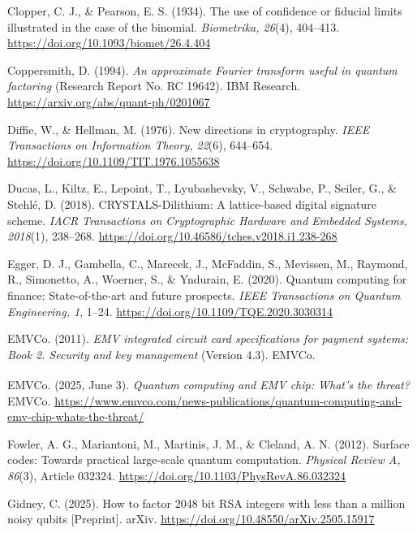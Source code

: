 \documentclass[12pt,oneside]{report}
\begin{document}
Clopper, C. J., \& Pearson, E. S. (1934). The use of confidence or fiducial limits illustrated in the case of the binomial. \textit{Biometrika, 26}(4), 404–413. \url{https://doi.org/10.1093/biomet/26.4.404}
\par

Coppersmith, D. (1994). \textit{An approximate Fourier transform useful in quantum factoring} (Research Report No. RC 19642). IBM Research. \url{https://arxiv.org/abs/quant-ph/0201067}
\par

Diffie, W., \& Hellman, M. (1976). New directions in cryptography. \textit{IEEE Transactions on Information Theory, 22}(6), 644–654. \url{https://doi.org/10.1109/TIT.1976.1055638}
\par

Ducas, L., Kiltz, E., Lepoint, T., Lyubashevsky, V., Schwabe, P., Seiler, G., \& Stehlé, D. (2018). CRYSTALS-Dilithium: A lattice-based digital signature scheme. \textit{IACR Transactions on Cryptographic Hardware and Embedded Systems, 2018}(1), 238–268. \url{https://doi.org/10.46586/tches.v2018.i1.238-268}
\par

Egger, D. J., Gambella, C., Marecek, J., McFaddin, S., Mevissen, M., Raymond, R., Simonetto, A., Woerner, S., \& Yndurain, E. (2020). Quantum computing for finance: State-of-the-art and future prospects. \textit{IEEE Transactions on Quantum Engineering, 1}, 1–24. \url{https://doi.org/10.1109/TQE.2020.3030314}
\par

EMVCo. (2011). \textit{EMV integrated circuit card specifications for payment systems: Book 2. Security and key management} (Version 4.3). EMVCo.
\par

EMVCo. (2025, June 3). \textit{Quantum computing and EMV\textsuperscript{\textregistered} chip: What's the threat?} EMVCo. \url{https://www.emvco.com/news-publications/quantum-computing-and-emv-chip-whats-the-threat/}
\par

Fowler, A. G., Mariantoni, M., Martinis, J. M., \& Cleland, A. N. (2012). Surface codes: Towards practical large-scale quantum computation. \textit{Physical Review A, 86}(3), Article 032324. \url{https://doi.org/10.1103/PhysRevA.86.032324}
\par

Gidney, C. (2025). How to factor 2048 bit RSA integers with less than a million noisy qubits [Preprint]. arXiv. \url{https://doi.org/10.48550/arXiv.2505.15917}
\par
\end{document}
